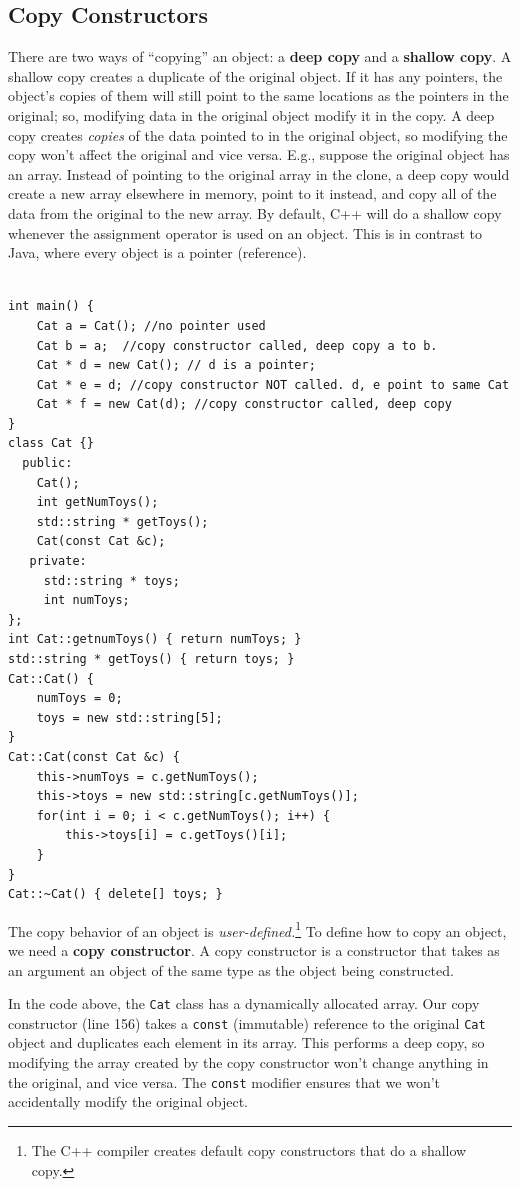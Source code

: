 \documentclass[12pt]{article}
\begin{document}
\subsection{Copy Constructors}
There are two ways of ``copying'' an object: a \textbf{deep copy} and
a \textbf{shallow copy}.  A shallow copy creates a duplicate of the
original object. If it has any pointers, the object's copies of them
will still point to the same locations as the pointers in the
original; so, modifying data in the original object modify it in the
copy. A deep copy creates \textit{copies} of the data pointed to in
the original object, so modifying the copy won't affect the original
and vice versa. E.g., suppose the original object has an
array. Instead of pointing to the original array in the clone, a deep
copy would create a new array elsewhere in memory, point to it
instead, and copy all of the data from the original to the new array.
By default, C++ will do a shallow copy whenever the assignment
operator is used on an object. This is in contrast to Java, where
every object is a pointer (reference).
\begin{verbatim}

int main() {
    Cat a = Cat(); //no pointer used
    Cat b = a;  //copy constructor called, deep copy a to b.
    Cat * d = new Cat(); // d is a pointer;
    Cat * e = d; //copy constructor NOT called. d, e point to same Cat
    Cat * f = new Cat(d); //copy constructor called, deep copy
}
class Cat {}
  public:
    Cat();
    int getNumToys();
    std::string * getToys();
    Cat(const Cat &c);
   private:
     std::string * toys; 
     int numToys;
};
int Cat::getnumToys() { return numToys; }
std::string * getToys() { return toys; }
Cat::Cat() {
    numToys = 0;
    toys = new std::string[5];
}
Cat::Cat(const Cat &c) {
    this->numToys = c.getNumToys();
    this->toys = new std::string[c.getNumToys()];
    for(int i = 0; i < c.getNumToys(); i++) {
        this->toys[i] = c.getToys()[i]; 
    }
}
Cat::~Cat() { delete[] toys; }
\end{verbatim}
The copy behavior of an object is \textit{user-defined.}\footnote{The
  C++ compiler creates default copy constructors that do a shallow
  copy.}  To define how to copy an object, we need a \textbf{copy
  constructor}.  A copy constructor is a constructor that takes as an
argument an object of the same type as the object being constructed.



In the code above, the \texttt{Cat} class has a dynamically allocated
array.  Our copy constructor (line 156) takes a \texttt{const}
(immutable) reference to the original \texttt{Cat} object and
duplicates each element in its array.  This performs a deep copy, so
modifying the array created by the copy constructor won't change
anything in the original, and vice versa.  The \texttt{const} modifier
ensures that we won't accidentally modify the original object.
\end{document}
